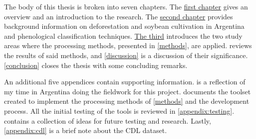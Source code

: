 The body of this thesis is broken into seven chapters. The \hyperref[intro]{first chapter} gives an overview and an introduction to the research. The \hyperref[background]{second chapter} provides background information on deforestation and soybean cultivation in Argentina and phenological classification techniques. \hyperref[studyareas]{The third} introduces the two study areas where the processing methods, presented in \cref{methods}, are applied.  reviews the results of said methods, and \cref{discussion} is a discussion of their significance. \cref{conclusion} closes the thesis with some concluding remarks.

An additional five appendices contain supporting information.  is a reflection of my time in Argentina doing the fieldwork for this project.  documents the toolset created to implement the processing methods of \cref{methods} and the development process. All the initial testing of the tools is reviewed in \cref{appendix:testing}.  contains a collection of ideas for future testing and research. Lastly, \cref{appendix:cdl} is a brief note about the CDL dataset.
